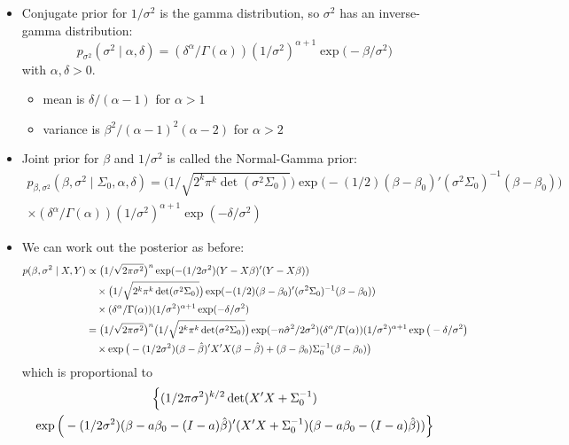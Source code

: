 \begin{itemize}
\item Conjugate prior for $1/\sigma^2$ is the gamma distribution, so $\sigma^2$
  has an inverse-gamma distribution:
  \[p_{\sigma^2}(\sigma^2 \mid \alpha, \delta) = (\delta^\alpha/\Gamma(\alpha)) (1/\sigma^2)^{\alpha+1} \exp\big(-\beta/\sigma^2\big)\]
  with $\alpha,\delta > 0$.
\begin{itemize}
\item mean is $\delta / (\alpha - 1)$ for $\alpha > 1$
\item variance is $\beta^2 / (\alpha-1)^2(\alpha-2)$ for $\alpha > 2$
\end{itemize}
\item Joint prior for $\beta$ and $1/\sigma^2$ is called the Normal-Gamma prior:
  \begin{multline*}
    p_{\beta,\sigma^2}(\beta, \sigma^2 \mid \Sigma_0, \alpha, \delta) = \Big(1/\sqrt{2^k \pi^k \det(\sigma^2 \Sigma_0)}\Big)
    \exp\big(- (1/2) (\beta - \beta_0)'(\sigma^2 \Sigma_0)^{-1} (\beta - \beta_0)\big)
    \\ \times (\delta^\alpha/\Gamma(\alpha)) (1/\sigma^2)^{\alpha+1} \exp(-\delta/\sigma^2)
  \end{multline*}
\item We can work out the posterior as before:
  \begin{align*}
    p(\beta, \sigma^2 \mid X, Y) 
    &\propto \big(1/\sqrt{2 \pi \sigma^2}\big)^n
       \exp(-(1/2\sigma^2) (Y - X\beta)'(Y - X\beta)) \\
    &\quad \times \big(1/\sqrt{2^k \pi^k \det(\sigma^2 \Sigma_0)}\big) \exp(-(1/2) (\beta - \beta_0)'(\sigma^2 \Sigma_0)^{-1} (\beta - \beta_0)) \\
    &\quad \times (\delta^\alpha/\Gamma(\alpha)) (1/\sigma^2)^{\alpha+1} \exp(-\delta/\sigma^2) \\
    &= \big(1/\sqrt{2 \pi \sigma^2}\big)^n \big(1/\sqrt{2^k \pi^k \det(\sigma^2 \Sigma_0)}\big)
       \exp(- n \hat{\sigma}^2/2 \sigma^2)
       (\delta^\alpha/\Gamma(\alpha)) (1/\sigma^2)^{\alpha+1} \exp\big(- \delta/\sigma^2\big) \\
    &\quad \times \exp\big(- (1/2\sigma^2) (\beta - \hat{\beta})'X'X(\beta - \hat{\beta}) 
      + (\beta - \beta_0)\Sigma_0^{-1}(\beta - \beta_0)\big)
  \end{align*}
  which is proportional to 
  \begin{multline*}
    \Big\{(1/2\pi\sigma^2)^{k/2} \det(X'X + \Sigma_0^{-1}) \\
          \exp\Big( -(1/2\sigma^2) (\beta - a\beta_0 - (I-a)\betah)' (X'X + \Sigma_0^{-1})(\beta - a\beta_0 - (I-a)\betah)) \Big\} \\

\end{multline*}
\end{itemize}

